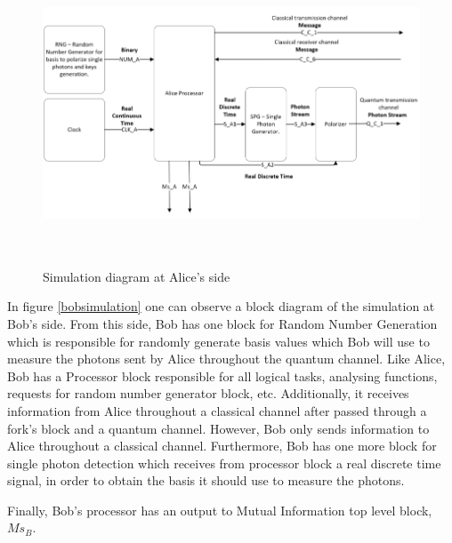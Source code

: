 \begin{figure}[H]
	\centering
	\includegraphics[width=1.0\textwidth, height=9cm]{./sdf/bb84_with_discrete_variables/figures/alice_simulation.png}
	\caption{Simulation diagram at Alice's side}\label{alicesimulation}
\end{figure}

     In figure \ref{bobsimulation} one can observe a block diagram of the simulation at Bob's side. From this side, Bob has one block for Random Number Generation which is responsible for randomly generate basis values which Bob will use to measure the photons sent by Alice throughout the quantum channel. Like Alice, Bob has a Processor block responsible for all logical tasks, analysing functions, requests for random number generator block, etc. Additionally, it receives information from Alice throughout a classical channel after passed through a fork's block and a quantum channel. However, Bob only sends information to Alice throughout a classical channel. Furthermore, Bob has one more block for single photon detection which receives from processor block a real discrete time signal, in order to obtain the basis it should use to measure the photons.

    Finally, Bob's processor has an output to Mutual Information top level block, $Ms_{B}$.
    

